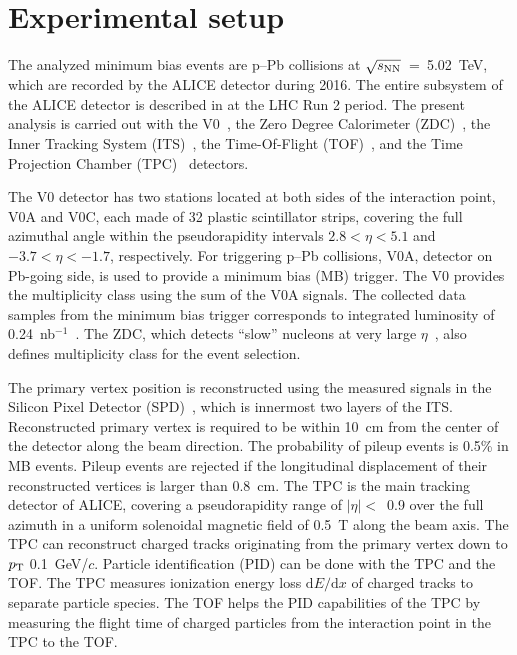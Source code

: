 

\section{Experimental setup}
\label{sec:setup}
The analyzed minimum bias events are p--Pb collisions at $\sqrt{s_{\rm NN}}$~=~5.02~TeV, which are recorded by the ALICE detector during 2016. The entire subsystem of the ALICE detector is described in \cite{Carminati:2004fp, Abelev:2014ffa} at the LHC Run 2 period. The present analysis is carried out with the V0~\cite{ALICE:2013axi}, the Zero Degree Calorimeter (ZDC)~\cite{Cortese:2019nnv}, the Inner Tracking System (ITS)~\cite{ALICE:2010tia}, the Time-Of-Flight (TOF)~\cite{Jacazio:2018slq}, and the Time Projection Chamber (TPC)~\cite{Alme:2010ke} detectors.

The V0 detector has two stations located at both sides of the interaction point, V0A and V0C, each made of 32 plastic scintillator strips, covering the full azimuthal angle within the pseudorapidity intervals $2.8 < \eta < 5.1$ and $-3.7 < \eta < -1.7$, respectively. For triggering p--Pb collisions, V0A, detector on Pb-going side, is used to provide a minimum bias (MB) trigger. The V0 provides the multiplicity class using the sum of the V0A signals. The collected data samples from the minimum bias trigger corresponds to integrated luminosity of 0.24~nb$^{-1}$~\cite{ALICE:2014gvw}. The ZDC, which detects ``slow'' nucleons at very large $\eta$~\cite{Cortese:2019nnv},  also defines multiplicity class for the event selection.

The primary vertex position is reconstructed using the measured signals in the Silicon Pixel Detector (SPD)~\cite{Santoro2009:ALICESPD}, which is innermost two layers of the ITS. Reconstructed primary vertex is required to be within 10~cm from the center of the detector along the beam direction. The probability of pileup events is 0.5\% in MB events. Pileup events are rejected if the longitudinal displacement of their reconstructed vertices is larger than 0.8~cm. The TPC is the main tracking detector of ALICE, covering a pseudorapidity range of $|\eta|<$~0.9 over the full azimuth in a uniform solenoidal magnetic field of 0.5~T along the beam axis. The TPC can reconstruct charged tracks originating from the primary vertex down to $p_{\rm{T}}~$0.1~GeV/$c$. Particle identification (PID) can be done with the TPC and the TOF. The TPC measures ionization energy loss $\mathrm{d}E/\mathrm{d}x$ of charged tracks to separate particle species. The TOF helps the PID capabilities of the TPC by measuring the flight time of charged particles from the interaction point in the TPC to the TOF.

